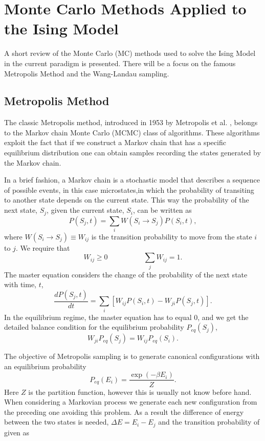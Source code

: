 \chapter{Monte Carlo Methods Applied to the Ising Model}

A short review of the Monte Carlo (MC) methods used to solve the Ising Model in the current paradigm is presented. There will be a focus on the famous Metropolis Method and the Wang-Landau sampling. 

\section{Metropolis Method}

The classic Metropolis method, introduced in 1953 by Metropolis et al. \cite{Metropolis1953}, belongs to the Markov chain Monte Carlo (MCMC) class of algorithms. These algorithms exploit the fact that if we construct a Markov chain that has a specific equilibrium distribution one can obtain samples recording the states generated by the Markov chain. 

In a brief fashion, a Markov chain is a stochastic model that describes a sequence of possible events, in this case microstates,in which the probability of transiting to another state depends on the current state. This way the probability of the next state, $S_j$, given the current state, $S_i$, can be written as 
\begin{equation}
	P(S_j, t) = \sum_i W(S_i \rightarrow S_j) P(S_i, t),
\end{equation}
where $W(S_i \rightarrow S_j) \equiv W_{ij}$ is the transition probability to move from the state $i$ to $j$. We require that 
\begin{equation}
	W_{ij}  \geq 0 \quad \quad \quad \quad \quad \sum_j W_{ij}=1.
\end{equation}
The master equation considers the change of the probability of the next state with time, $t$,
\begin{equation}
	\frac{dP(S_j, t)}{dt} = \sum_i \left[ W_{ij}P(S_i, t) - W_{ji} P(S_j,t)  \right].
\end{equation}
In the equilibrium regime, the master equation has to equal $0$, and we get the detailed balance condition for the equilibrium probability $P_{eq}(S_j)$,
\begin{equation}
	W_{ji}P_{eq}(S_j) = W_{ij}P_{eq}(S_i).
\end{equation}

The objective of Metropolis sampling is to generate canonical configurations with an equilibrium probability
\begin{equation} \label{eq:met_prob_eq}
	P_{eq}(E_i) = \frac{\exp(-\beta E_i)}{Z}.
\end{equation}
Here $Z$ is the partition function, however this is usually not know before hand. When considering a Markovian process we generate each new configuration from the preceding one avoiding this problem. As a result the difference of energy between the two states is needed, $\Delta E = E_i - E_j$ and the transition probability of given as

